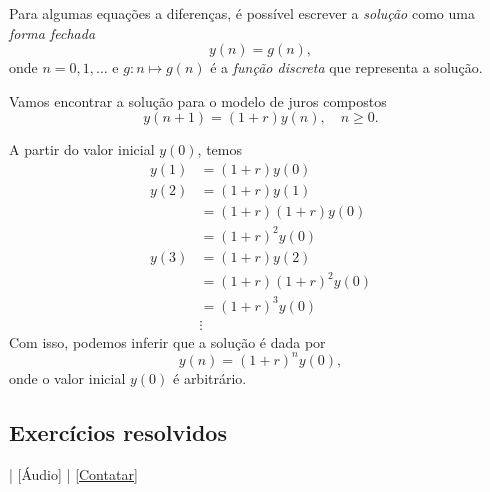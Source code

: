 Para algumas equações a diferenças, é possível escrever a \emph{solução} como uma \emph{forma fechada}
\begin{equation}
  y(n) = g(n),
\end{equation}
onde $n = 0, 1, \ldots$ e $g:n\mapsto g(n)$ é a \emph{função discreta} que representa a solução.

\begin{ex}
  Vamos encontrar a solução para o modelo de juros compostos
  \begin{equation}
    y(n+1) = (1+r)y(n),\quad n\geq 0.
  \end{equation}

  A partir do valor inicial $y(0)$, temos
  \begin{align}
    y(1) &= (1+r)y(0)\\
    y(2) &= (1+r)y(1)\\
    &= (1+r)(1+r)y(0)\\
    &= (1+r)^2y(0) \\
    y(3) &= (1+r)y(2)\\
    &= (1+r)(1+r)^2y(0)\\
    &= (1+r)^3y(0)\\
    &\vdots
  \end{align}
  Com isso, podemos inferir que a solução é dada por
  \begin{equation}
    y(n) = (1+r)^ny(0),
  \end{equation}
  onde o valor inicial $y(0)$ é arbitrário.
\end{ex}

\subsection*{Exercícios resolvidos}

\begin{flushright}
  [Vídeo] | [Áudio] | \href{https://phkonzen.github.io/notas/contato.html}{[Contatar]}
\end{flushright}

